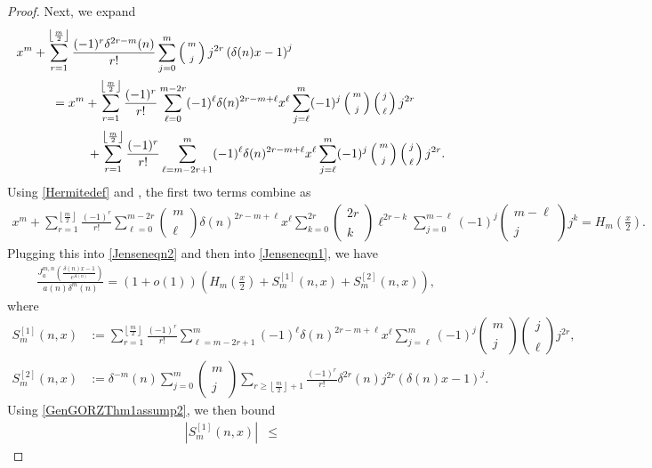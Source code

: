 \documentclass[11pt,reqno,a4paper]{amsart}
\renewcommand{\d}{{\delta}}
\renewcommand{\(}{\left\(}
\renewcommand{\)}{\right\)}
\numberwithin{equation}{section}
\theoremstyle{plain}
\theoremstyle{definition} %
\numberwithin{equation}{section}
\renewcommand{\binom}[2]{\left(\begin{smallmatrix}#1\\\\#2\end{smallmatrix}\right)}
\begin{document}
\begin{proof}
	
	Next, we expand
	\begin{align}\label{Jenseneqn2}
	&x^m+\sum_{r=1}^{\left\lfloor\frac m2\right\rfloor}\frac{(-1)^r\d^{2r-m}(n)}{r!}\sum_{j=0}^{m}\binom{m}{j}j^{2r}\left(\d(n)x-1\right)^j\nonumber\\
	&\hspace{1 cm}=x^m+\sum_{r=1}^{\left\lfloor\frac m2\right\rfloor}\frac{(-1)^r}{r!}\sum_{\ell=0}^{m-2r}(-1)^{\ell}\d(n)^{2r-m+\ell}x^{\ell}\sum_{j=\ell}^{m}(-1)^j\binom{m}{j}\binom{j}{\ell}j^{2r}\nonumber\\
	&\hspace{2 cm}+\sum_{r=1}^{\left\lfloor\frac m2\right\rfloor}\frac{(-1)^r}{r!}\sum_{\ell=m-2r+1}^{m}(-1)^{\ell}\d(n)^{2r-m+\ell}x^{\ell}\sum_{j=\ell}^{m}(-1)^j\binom{m}{j}\binom{j}{\ell}j^{2r}.
	\end{align}
Using \eqref{Hermitedef} and , the first two terms combine as 
\begin{align*}
x^m+\sum_{r=1}^{\left\lfloor\frac m2\right\rfloor}\frac{(-1)^r}{r!}\sum_{\ell=0}^{m-2r}\binom{m}{\ell}\d(n)^{2r-m+\ell}x^{\ell}\sum_{k=0}^{2r}\binom{2r}{k}\ell^{2r-k}\sum_{j=0}^{m-\ell}(-1)^{j}\binom{m-\ell}{j}j^k=H_m\left(\frac x2\right).
\end{align*}
Plugging this into \eqref{Jenseneqn2} and then into \eqref{Jenseneqn1}, we have 
	\begin{align}\label{Jenseneqn5}
	&\frac{J^{m,n}_{a}\left(\frac{\d(n)x-1}{e^{A(n)}}\right)}{a(n)\d^{m}(n)}
	=\left(1+o\left(1\right)\right)\left(H_m\left(\frac x2\right)+S^{[1]}_m(n,x)+S^{[2]}_m(n,x)\right),
	\end{align}
	where 
	\begin{align*}%
	S^{[1]}_m(n,x)&:=\sum_{r=1}^{\left\lfloor\frac m2\right\rfloor}\frac{(-1)^r}{r!}\sum_{\ell=m-2r+1}^{m}(-1)^{\ell}\d(n)^{2r-m+\ell}x^{\ell}\sum_{j=\ell}^{m}(-1)^j\binom{m}{j}\binom{j}{\ell}j^{2r},\nonumber\\%
	S^{[2]}_m(n,x)&:=\d^{-m}(n)\sum_{j=0}^{m}\binom{m}{j}\sum_{r\ge \left\lfloor\frac m2\right\rfloor+1}\frac{\left(-1\right)^r}{r!}\d^{2r}(n)j^{2r}\left(\d(n)x-1\right)^j.%
	\end{align*}
Using \ref{GenGORZThm1assump2}, we then bound 	%
	\begin{align}\label{Jenseneqn9}
	\left|S^{[1]}_m(n,x)\right|&\le 

\end{align}
\end{proof}
\end{document}
